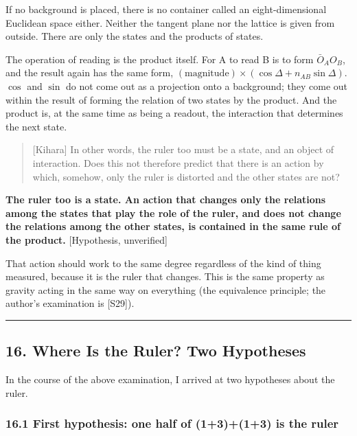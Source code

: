 \documentclass[
  a4paper,
]{article}
\begin{document}
If no background is placed, there is no container called an
eight-dimensional Euclidean space either. Neither the tangent plane nor
the lattice is given from outside. There are only the states and the
products of states.

The operation of reading is the product itself. For A to read B is to
form \(\bar O_AO_B\), and the result again has the same form,
\((\text{magnitude})\times(\cos\Delta + n_{AB}\sin\Delta)\). \(\cos\)
and \(\sin\) do not come out as a projection onto a background; they
come out within the result of forming the relation of two states by the
product. And the product is, at the same time as being a readout, the
interaction that determines the next state.

\begin{quote}
{[}Kihara{]} In other words, the ruler too must be a state, and an
object of interaction. Does this not therefore predict that there is an
action by which, somehow, only the ruler is distorted and the other
states are not?
\end{quote}

\textbf{The ruler too is a state. An action that changes only the
relations among the states that play the role of the ruler, and does not
change the relations among the other states, is contained in the same
rule of the product.} {[}Hypothesis, unverified{]}

That action should work to the same degree regardless of the kind of
thing measured, because it is the ruler that changes. This is the same
property as gravity acting in the same way on everything (the
equivalence principle; the author's examination is {[}S29{]}).

\begin{center}\rule{0.5\linewidth}{0.5pt}\end{center}

\subsection{16. Where Is the Ruler? Two
Hypotheses}\label{where-is-the-ruler-two-hypotheses}

In the course of the above examination, I arrived at two hypotheses
about the ruler.

\subsubsection{16.1 First hypothesis: one half of (1+3)+(1+3) is the
ruler}\label{first-hypothesis-one-half-of-1313-is-the-ruler}
\end{document}
